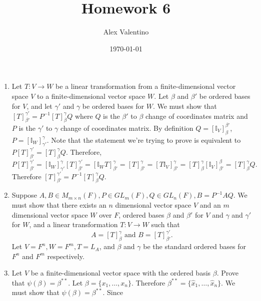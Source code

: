 \documentclass[12pt, letterpaper]{article}
\date{\today}
\author{Alex Valentino}
\title{Homework 6}
\begin{document}
	\begin{enumerate}
		\item Let $T: V \to W$ be a linear transformation from a finite-dimensional vector space $V$ to a finite-dimensional vector space $W$.  Let $
		\beta$ and $\beta'$ be ordered bases for $V$, and let $\gamma'$ and $\gamma$ be ordered bases for $W$.  We must show that $[T]^{\gamma'}_{\beta'} = P^{-1}[T]^\gamma_\beta Q$ where $Q$ is the $\beta'$ to $\beta$ change of coordinates matrix and $P$ is the $\gamma'$ to $\gamma$ change of coordinates matrix.  By definition $Q = [\mathbb{I}_V]^{\beta'}_\beta$, $P = [\mathbb{I}_W]^{\gamma}_{\gamma'}$.  Note that the statement we're trying to prove is equivalent to $P [T]^{\gamma'}_{\beta'} = [T]^\gamma_\beta Q$.  Therefore, 
		$$
					P [T]^{\gamma'}_{\beta'} = [\mathbb{I}_W]^{\gamma}_{\gamma'} [T]^{\gamma'}_{\beta'} = [\mathbb{I}_W T]^\gamma_{\beta'} = [T]^\gamma_{\beta'} = [T \mathbb{I}_V]^\gamma_{\beta'} = [T]^{\gamma}_\beta [\mathbb{I}_V]^{\beta}_{\beta'} = [T]^\gamma_\beta Q.
		$$  
		Therefore $[T]^{\gamma'}_{\beta'} = P^{-1}[T]^\gamma_\beta Q$. 
		
		\newpage
		\item Suppose $A,B \in M_{m \times n}(F), P \in GL_m (F), Q \in GL_n (F), B = P^{-1} A Q$.  We must show that there exists an $n$ dimensional vector space $V$ and an $m$ dimensional vector space $W$ over $F$, ordered bases $\beta$ and $\beta'$ for $V$ and $\gamma$ and $\gamma'$ for $W$, and a linear transformation $T: V \to W$ such that $$A = [T]^{\gamma}_\beta \text{ and } B = [T]^{\gamma'}_{\beta'}.$$
		Let $V = F^n, W= F^m, T = L_A$, and $\beta$ and $\gamma$ be the standard ordered bases for $F^n$ and $F^m$ respectively.
		\newpage
		\item Let $V$ be a finite-dimensional vector space with the ordered basis $\beta$.  Prove that $\psi(\beta) = \beta^{**}$.
			Let $\beta = \{x_1,\ldots,x_n\}$.  Therefore $\beta^{**} = \{\hat{x}_1,\ldots,\hat{x}_n\}$.  We must show that $\psi (\beta) = \beta^{**}$.  Since 
	\end{enumerate}
\end{document}

